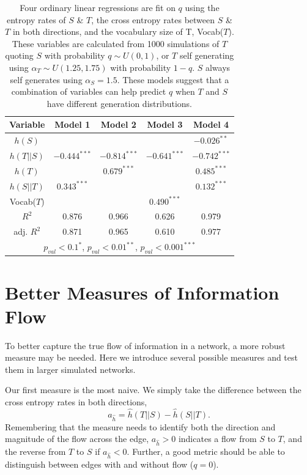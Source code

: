 \begin{table}[!htbp]
\centering 
\begin{tabular}{c|cccc}
Variable& Model 1& Model 2& Model 3& Model 4\\ \hline
$h(S)$& & & & $-0.026^{**}$\\
$h(T||S)$& $-0.444^{***}$& $-0.814^{***}$& $-0.641^{***}$& $-0.742^{***}$\\
$h(T)$& & $0.679^{***}$& & $0.485^{***}$\\
$h(S||T)$& $0.343^{***}$& & & $0.132^{***}$\\
Vocab($T$)& & & $0.490^{***}$& \\\hline
\rule{0pt}{3ex}$R^2$& 0.876& 0.966& 0.626& 0.979\\ \hline
\rule{0pt}{3ex}adj. $R^2$& 0.871& 0.965& 0.610& 0.977\\ \hline
\multicolumn{5}{c}{$p_{val}<0.1^*$, $p_{val}<0.01^{**}$, $p_{val}<0.001^{***}$} \\ \hline\end{tabular}
\caption{Four ordinary linear regressions are fit on $q$ using the entropy rates of $S$ \& $T$, the cross entropy rates between $S$ \& $T$ in both directions, and the vocabulary size of T, Vocab($T$). These variables are calculated from 1000 simulations of $T$ quoting $S$ with probability $q\sim U(0,1)$, or $T$ self generating using $\alpha_T\sim U(1.25, 1.75)$ with probability $1-q$. $S$ always self generates using $\alpha_S = 1.5$. These models suggest that a combination of variables can help predict $q$ when $T$ and $S$ have different generation distributions.} \label{tab:quoter_mutlipleOLS}
\end{table}


\section{Better Measures of Information Flow}

To better capture the true flow of information in a network, a more robust measure may be needed. Here we introduce several possible measures and test them in larger simulated networks.

Our first measure is the most naive. We simply take the difference between the cross entropy rates in both directions, 
\begin{equation}a_{\hat{h}}  = \hat{h}(T||S) - \hat{h}(S||T).\end{equation}
Remembering that the measure needs to identify both the direction and magnitude of the flow across the edge, $a_{\hat{h}} >0$ indicates a flow from $S$ to $T$, and the reverse from $T$ to $S$ if $a_{\hat{h}} <0$. Further, a good metric should be able to distinguish between edges with and without flow ($q=0$). 


